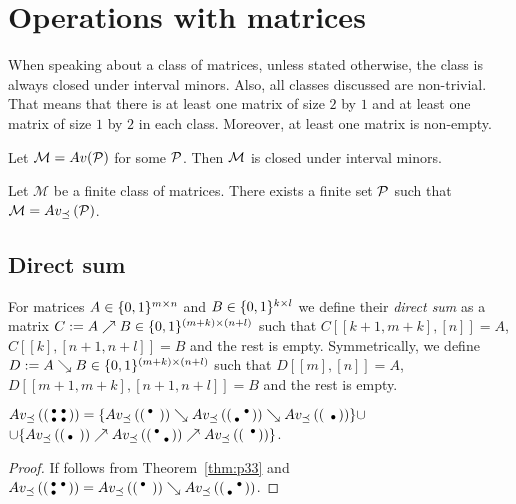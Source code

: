 \chapter{Operations with matrices}
When speaking about a class of matrices, unless stated otherwise, the class is always closed under interval minors. Also, all classes discussed are non-trivial. That means that there is at least one matrix of size $2$ by $1$ and at least one matrix of size $1$ by $2$ in each class. Moreover, at least one matrix is non-empty.

\begin{obs}
Let $\mathcal{M}=Av(\mathcal{P})$ for some $\mathcal{P}$. Then $\mathcal{M}$ is closed under interval minors.
\end{obs}

\begin{obs}
Let $\mathcal{M}$ be a finite class of matrices. There exists a finite set $\mathcal{P}$ such that $\mathcal{M}=Av_{\preceq}\left(\mathcal{P}\right)$.
\end{obs}

\section{Direct sum}

\begin{defn}
For matrices $A\in\{0,1\}^{m\times n}$ and $B\in\{0,1\}^{k\times l}$ we define their \emph{direct sum} as a matrix $C:=A\nearrow B\in\{0,1\}^{(m+k)\times(n+l)}$ such that $C[[k+1,m+k],[n]]=A$, $C[[k],[n+1,n+l]]=B$ and the rest is empty. Symmetrically, we define $D:=A\searrow B\in\{0,1\}^{(m+k)\times(n+l)}$ such that $D[[m],[n]]=A$, $D[[m+1,m+k],[n+1,n+l]]=B$ and the rest is empty.
\end{defn}

\begin{prop}
$Av_{\preceq}\left(\left(\begin{smallmatrix}\bullet&\bullet\\\bullet&\bullet\end{smallmatrix}\right)\right)=\{Av_{\preceq}\left(\left(\begin{smallmatrix}\bullet& \\ & \end{smallmatrix}\right)\right)\searrow Av_{\preceq}\left(\left(\begin{smallmatrix} &\bullet\\\bullet& \end{smallmatrix}\right)\right)\searrow Av_{\preceq}\left(\left(\begin{smallmatrix} & \\ &\bullet\end{smallmatrix}\right)\right)\}\cup$\\
$\cup\{Av_{\preceq}\left(\left(\begin{smallmatrix} & \\\bullet& \end{smallmatrix}\right)\right)\nearrow Av_{\preceq}\left(\left(\begin{smallmatrix}\bullet& \\ &\bullet\end{smallmatrix}\right)\right)\nearrow Av_{\preceq}\left(\left(\begin{smallmatrix} &\bullet\\ & \end{smallmatrix}\right)\right)\}$.
\end{prop}
\begin{proof}
If follows from Theorem~\ref{thm:p33} and $Av_{\preceq}\left(\left(\begin{smallmatrix}\bullet&\bullet\\\bullet& \end{smallmatrix}\right)\right)=Av_{\preceq}\left(\left(\begin{smallmatrix}\bullet& \\ & \end{smallmatrix}\right)\right)\searrow Av_{\preceq}\left(\left(\begin{smallmatrix} &\bullet\\\bullet& \end{smallmatrix}\right)\right)$.
\end{proof}

